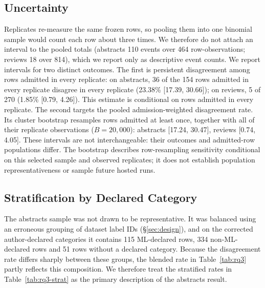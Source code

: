 \documentclass[11pt]{article}
\begin{document}
\subsection{Uncertainty}
Replicates re-measure the same frozen rows, so pooling them into one
binomial sample would count each row about three times. We therefore do not
attach an interval to the pooled totals (abstracts 110 events over 464
row-observations; reviews 18 over 814), which we report only as descriptive
event counts. We report intervals for two distinct outcomes. The first
is persistent disagreement among rows admitted in every replicate: on
abstracts, 36 of the 154 rows
admitted in every replicate disagree in every replicate (23.38\%
[17.39, 30.66]); on reviews, 5 of 270 (1.85\% [0.79, 4.26]). This estimate is
conditional on rows admitted in every replicate. The second targets the
pooled admission-weighted disagreement rate. Its cluster bootstrap resamples
rows admitted at least once, together with all of their replicate
observations ($B = 20{,}000$): abstracts [17.24, 30.47], reviews
[0.74, 4.05]. These intervals are not interchangeable: their outcomes and
admitted-row populations differ. The bootstrap describes row-resampling
sensitivity conditional on this selected sample and observed replicates;
it does not establish population representativeness or sample future hosted runs.

\subsection{Stratification by Declared Category}

The abstracts sample was not drawn to be representative. It was balanced
using an erroneous grouping of dataset label IDs (\S\ref{sec:design}), and on
the corrected author-declared categories it contains 115 ML-declared rows,
334 non-ML-declared rows and 51 rows without a declared category. Because the
disagreement rate differs sharply between these groups, the blended rate in
Table~\ref{tab:rq3} partly reflects this composition. We therefore treat the
stratified rates in Table~\ref{tab:rq3-strat} as the primary description of
the abstracts result.

\begin{table}[t]
\centering
\caption{Abstracts disagreement rate among admitted rows, stratified by the
  authors' declared arXiv primary category. Admitted rows without a declared
  category (16 per replicate, of which 3 disagree) are excluded. Wilson 95\%
  intervals.}
\label{tab:rq3-strat}
\smallskip
\small
{}
\end{table}
\end{document}
